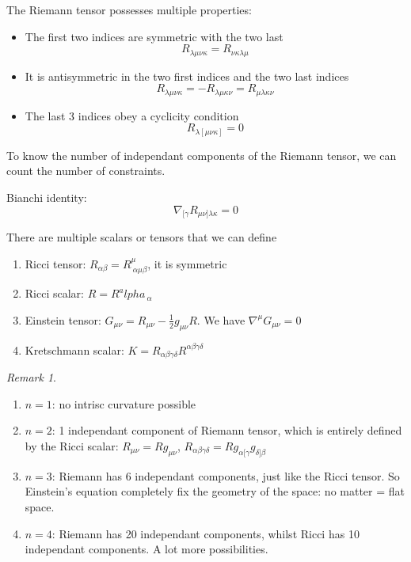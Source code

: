 \documentclass[a4paper]{book}
\theoremstyle{definition}
\theoremstyle{remark}
\newtheorem*{remark}{Remark}
\begin{document}
\noindent The Riemann tensor possesses multiple properties: 
\begin{itemize}
    \item The first two indices are symmetric with the two last
    \begin{equation}
        R_{\lambda \mu\nu\kappa} = R_{\nu\kappa\lambda\mu}
    \end{equation}
    \item It is antisymmetric in the two first indices and the two last indices
    \begin{equation}
        R_{\lambda \mu\nu\kappa} = - R_{\lambda \mu\kappa\nu} = R_{\mu\lambda\kappa\nu}
    \end{equation}
    \item The last 3 indices obey a cyclicity condition 
    \begin{equation}
        R_{\lambda [\mu\nu\kappa]} = 0
    \end{equation}
\end{itemize}

To know the number of independant components of the Riemann tensor, we can count the number of constraints. 


Bianchi identity:
\begin{equation}
    \nabla_{[\gamma}R_{\mu\nu]\lambda\kappa} = 0
\end{equation}

There are multiple scalars or tensors that we can define 
\begin{enumerate}
    \item Ricci tensor: $R_{\alpha\beta} = R^\mu_{~\alpha\mu\beta}$, it is symmetric
    \item Ricci scalar: $R = R^alpha_{~\alpha}$
    \item Einstein tensor: $G_{\mu\nu} = R_{\mu\nu} - \frac{1}{2}g_{\mu\nu}R$. We have $\nabla^\mu G_{\mu\nu} = 0$
    \item Kretschmann scalar: $K = R_{\alpha\beta\gamma\delta}R^{\alpha\beta\gamma\delta}$
\end{enumerate}

\begin{remark}
    \begin{enumerate}
        \item $n = 1$: no intrisc curvature possible 
        \item $n=2$: 1 independant component of Riemann tensor, which is entirely defined by the Ricci scalar: $R_{\mu\nu} = Rg_{\mu\nu}$, $R_{\alpha\beta\gamma\delta} = R g_{\alpha[\gamma}g_{\delta]\beta}$
        \item $n=3$: Riemann has 6 independant components, just like the Ricci tensor. So Einstein's equation completely fix the geometry of the space: no matter = flat space. 
        \item $n=4$: Riemann has 20 independant components, whilst Ricci has 10 independant components. A lot more possibilities. 
    \end{enumerate}
\end{remark}
\end{document}
